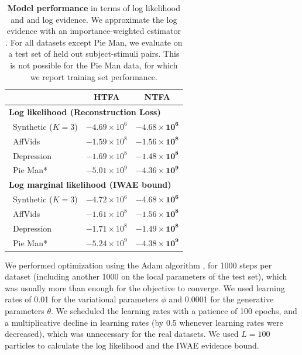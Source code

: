 \documentclass[twoside]{article}
\begin{document}
\begin{table}[!t]
\caption{\textbf{Model performance} in terms of log likelihood and and log evidence. We approximate the log evidence with an importance-weighted estimator \citep{Burda2016}. For all datasets except Pie Man, we evaluate on a test set of held out subject-stimuli pairs. This is not possible for the Pie Man data, for which we report training set performance.}
\label{table:reconstruction_errors}
\begin{center}
\begin{tabular}{lcc}
\toprule
 & \textbf{HTFA} & \textbf{NTFA} \\
\midrule
\multicolumn{3}{l}{\textbf{Log likelihood (Reconstruction Loss)}}\\
~Synthetic ($K\!=\!3$) & $-4.69 \times 10^6$ & $\mathbf{-4.68 \times 10^6}$ \\
~AffVids & $-1.59 \times 10^8$ & $\mathbf{-1.56 \times 10^8}$ \\
~Depression & $-1.69 \times 10^8$ &  $\mathbf{-1.48 \times 10^8}$\\
~Pie Man*  &  $-5.01 \times 10^9$ & $\mathbf{-4.36 \times 10^9}$ \\
\midrule
\multicolumn{3}{l}{\textbf{Log marginal likelihood (IWAE bound)}}\\
~Synthetic ($K=3$) & $-4.72 \times 10^6$ & $\mathbf{-4.68 \times 10^6}$ \\
~AffVids & $-1.61 \times 10^8$ & $\mathbf{-1.56 \times 10^8}$ \\
~Depression & $-1.71 \times 10^8$ &  $\mathbf{-1.49 \times 10^8}$\\
~Pie Man*  & $-5.24 \times 10^9$ & $\mathbf{-4.38 \times 10^9}$ \\
\bottomrule
\end{tabular}
\end{center}
\vspace{-1em}
\end{table}
We performed optimization using the Adam algorithm \citep{Kingma2015}, for 1000 steps per dataset (including another 1000 on the local parameters of the test set), which was usually more than enough for the objective to converge.  We used learning rates of 0.01 for the variational parameters $\phi$ and 0.0001 for the generative parameters $\theta$.  We scheduled the learning rates with a patience of 100 epochs, and a multiplicative decline in learning rates (by 0.5 whenever learning rates were decreased), which was unnecessary for the real datasets.  We used $L=100$ particles to calculate the log likelihood and the IWAE evidence bound.
\vspace{-1em}
\end{document}
